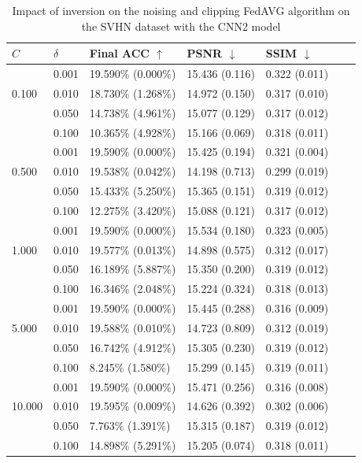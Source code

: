 \documentclass[conference,compsoc]{IEEEtran}
\begin{document}
\begin{table}[H]
\centering
\caption{Impact of inversion on the noising and clipping FedAVG algorithm on the SVHN dataset with the CNN2 model}
\label{table:dp_svhn_cnn2}
\begin{tabular}{lllllll}
\hline
$C$ & $\delta$ & \textbf{Final ACC} $\uparrow$ & \textbf{PSNR} $\downarrow$ & \textbf{SSIM} $\downarrow$ \\
\hline
\multirow{3}{*}{0.100} & 0.001 & 19.590\% (0.000\%) & 15.436 (0.116) & 0.322 (0.011) \\
& 0.010 & 18.730\% (1.268\%) & 14.972 (0.150) & 0.317 (0.010) \\
& 0.050 & 14.738\% (4.961\%) & 15.077 (0.129) & 0.317 (0.012) \\
& 0.100 & 10.365\% (4.928\%) & 15.166 (0.069) & 0.318 (0.011) \\
\hline
\multirow{3}{*}{0.500} & 0.001 & 19.590\% (0.000\%) & 15.425 (0.194) & 0.321 (0.004) \\
& 0.010 & 19.538\% (0.042\%) & 14.198 (0.713) & 0.299 (0.019) \\
& 0.050 & 15.433\% (5.250\%) & 15.365 (0.151) & 0.319 (0.012) \\
& 0.100 & 12.275\% (3.420\%) & 15.088 (0.121) & 0.317 (0.012) \\
\hline
\multirow{3}{*}{1.000} & 0.001 & 19.590\% (0.000\%) & 15.534 (0.180) & 0.323 (0.005) \\
& 0.010 & 19.577\% (0.013\%) & 14.898 (0.575) & 0.312 (0.017) \\
& 0.050 & 16.189\% (5.887\%) & 15.350 (0.200) & 0.319 (0.012) \\
& 0.100 & 16.346\% (2.048\%) & 15.224 (0.324) & 0.318 (0.013) \\
\hline
\multirow{3}{*}{5.000} & 0.001 & 19.590\% (0.000\%) & 15.445 (0.288) & 0.316 (0.009) \\
& 0.010 & 19.588\% (0.010\%) & 14.723 (0.809) & 0.312 (0.019) \\
& 0.050 & 16.742\% (4.912\%) & 15.305 (0.230) & 0.319 (0.012) \\
& 0.100 & 8.245\% (1.580\%) & 15.299 (0.145) & 0.319 (0.011) \\
\hline
\multirow{3}{*}{10.000} & 0.001 & 19.590\% (0.000\%) & 15.471 (0.256) & 0.316 (0.008) \\
& 0.010 & 19.595\% (0.009\%) & 14.626 (0.392) & 0.302 (0.006) \\
& 0.050 & 7.763\% (1.391\%) & 15.315 (0.187) & 0.319 (0.012) \\
& 0.100 & 14.898\% (5.291\%) & 15.205 (0.074) & 0.318 (0.011) \\
\hline
\end{tabular}
\end{table}
\end{document}
